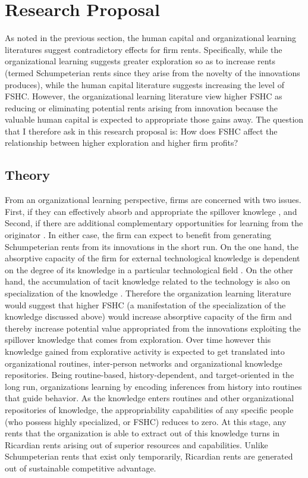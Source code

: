 \documentclass[12pt,letterpaper]{article}
\begin{document}
\section{Research Proposal}
As noted in the previous section, the human capital and organizational learning literatures suggest contradictory effects for firm rents. Specifically, while the organizational learning suggests greater exploration so as to increase rents (termed Schumpeterian rents since they arise from the novelty of the innovations produces), while the human capital literature suggests increasing the level of FSHC. However, the organizational learning literature view higher FSHC as reducing or eliminating potential rents arising from innovation because the valuable human capital is expected to appropriate those gains away.  The question that I therefore ask in this research proposal is: How does FSHC affect the relationship between higher exploration and higher firm profits?

\subsection{Theory}
From an organizational learning perspective, firms are concerned with two issues. First, if they can effectively absorb and appropriate the spillover knowlege \citep{Cohen1990}, and Second, if there are additional complementary opportunities for learning from the originator \citep{Teece1986}. In either case, the firm can expect to benefit from generating Schumpeterian rents from its innovations in the short run. On the one hand, the absorptive capacity of the firm for external technological knowledge is dependent on the degree of its knowledge in a particular technological field \citep{Schoenmakers2006}. On the other hand, the accumulation of tacit knowledge \citep{Polanyi1966} related to the technology is also on specialization of the knowledge \citep{Enright1991}. Therefore the organization learning literature would suggest that higher FSHC (a manifestation of the specialization of the knowledge discussed above) would increase absorptive capacity of the firm and thereby increase potential value appropriated from the innovations exploiting the spillover knowledge that comes from exploration. Over time however this knowledge gained from explorative activity is expected to get translated into organizational routines, inter-person networks and organizational knowledge repositories. Being routine-based, history-dependent, and target-oriented in the long run, organizations  learning by encoding inferences from history into routines that guide behavior. As the knowledge enters routines and other organizational repositories of knowledge, the appropriability capabilities of any specific people (who possess highly specialized, or FSHC) reduces to zero. At this stage, any rents that the organization is able to extract out of this knowledge turns in Ricardian rents arising out of superior resources and capabilities. Unlike Schumpeterian rents that exist only temporarily, Ricardian rents are generated out of sustainable competitive advantage.
\end{document}
